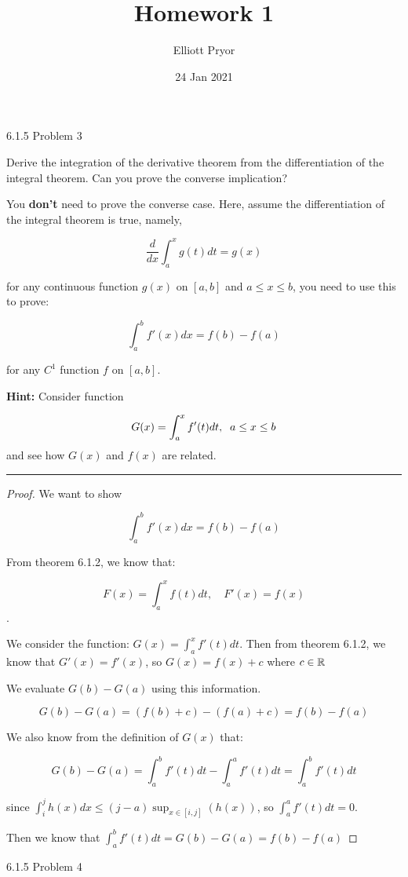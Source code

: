 \documentclass[11pt]{article}
\title{Homework 1}
\author{Elliott Pryor}
\date{24 Jan 2021}
\begin{document}
\maketitle

 6.1.5 Problem 3

Derive the integration of the derivative theorem from the differentiation of 
the integral theorem. Can you prove the converse implication?

You \textbf{don't} need to prove the converse case. Here, assume the differentiation of the integral
theorem is true, namely,

$$\frac{d}{dx} \int_a ^x g(t) dt = g(x)$$ 

for any continuous function $g(x)$ on $[a,b]$ and $a \leq x \leq b$, you need to use this to prove:

$$\int_a ^b f'(x) dx = f(b) - f(a)$$

for any $C^1$ function $f$ on $[a,b]$.

\textbf{Hint:} Consider function

$$G(x) = \int_a ^x f'(t)dt, \sp a \leq x \leq b$$
and see how $G(x)$ and $f(x)$ are related.
\hrule


\begin{proof}
    We want to show 

    $$\int_a ^b f'(x) dx = f(b) - f(a)$$

    From theorem 6.1.2, we know that:

    $$F(x) = \int_a ^x f(t)dt, \quad F'(x) = f(x)$$.

    We consider the function: $G(x) = \int_a ^x f'(t)dt$. 
    Then from theorem 6.1.2, we know that $G'(x) = f'(x)$, so $G(x) = f(x) + c$ where $c \in \reals$

    We evaluate $G(b) - G(a)$ using this information.

    $$G(b) - G(a) = (f(b) + c) - (f(a) + c) = f(b) - f(a)$$

    We also know from the definition of $G(x)$ that:

    $$G(b) - G(a) = \int_a ^b f'(t)dt - \int_a ^a f'(t)dt = \int_a ^b f'(t)dt $$
    
    since $\int_i ^j h(x)dx \leq (j - a) \sup_{x \in [i,j]}(h(x))$, so $\int_a ^a f'(t)dt = 0$.

    Then we know that $\int_a ^b f'(t)dt = G(b) - G(a) = f(b) - f(a)$

\end{proof}



 6.1.5 Problem 4
\end{document}
